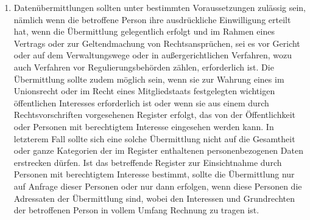 \begin{enumerate}
   \item Datenübermittlungen sollten unter bestimmten Voraussetzungen zulässig sein, nämlich wenn die betroffene Person
    ihre ausdrückliche Einwilligung erteilt hat, wenn die Übermittlung gelegentlich erfolgt und im Rahmen eines
    Vertrags oder zur Geltendmachung von Rechtsansprüchen, sei es vor Gericht oder auf dem Verwaltungswege oder in
    außergerichtlichen Verfahren, wozu auch Verfahren vor Regulierungsbehörden zählen, erforderlich ist. Die
    Übermittlung sollte zudem möglich sein, wenn sie zur Wahrung eines im Unionsrecht oder im Recht eines
    Mitgliedstaats festgelegten wichtigen öffentlichen Interesses erforderlich ist oder wenn sie aus einem durch
    Rechtsvorschriften vorgesehenen Register erfolgt, das von der Öffentlichkeit oder Personen mit berechtigtem
    Interesse eingesehen werden kann. In letzterem Fall sollte sich eine solche Übermittlung nicht auf die Gesamtheit
    oder ganze Kategorien der im Register enthaltenen personenbezogenen Daten erstrecken dürfen. Ist das betreffende
    Register zur Einsichtnahme durch Personen mit berechtigtem Interesse bestimmt, sollte die Übermittlung nur auf
    Anfrage dieser Personen oder nur dann erfolgen, wenn diese Personen die Adressaten der Übermittlung sind, wobei den
    Interessen und Grundrechten der betroffenen Person in vollem Umfang Rechnung zu tragen ist.%
   \label{eg:111}
   


\end{enumerate}
